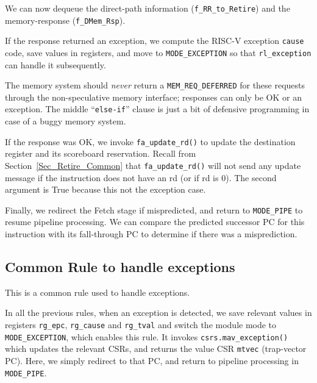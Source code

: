 
We can now dequeue the direct-path information (\verb|f_RR_to_Retire|)
and the memory-response (\verb|f_DMem_Rsp|).

If the response returned an exception, we compute the RISC-V exception
\verb|cause| code, save values in registers, and move to
\verb|MODE_EXCEPTION| so that \verb|rl_exception| can handle it
subsequently.

The memory system should \emph{never} return a \verb|MEM_REQ_DEFERRED|
for these requests through the non-speculative memory interface;
responses can only be OK or an exception.  The middle
``\verb|else-if|'' clause is just a bit of defensive programming in
case of a buggy memory system.

If the response was OK, we invoke \verb|fa_update_rd()| to update the
destination register and its scoreboard reservation.  Recall from
Section~\ref{Sec_Retire_Common} that \verb|fa_update_rd()| will not
send any update message if the instruction does not have an rd (or if
rd is 0).  The second argument is True because this not the exception
case.

Finally, we redirect the Fetch stage if mispredicted, and return to
\verb|MODE_PIPE| to resume pipeline processing.  We can compare the
predicted successor PC for this instruction with its fall-through PC
to determine if there was a misprediction.




\subsection{Common Rule to handle exceptions}

\label{Sec_Fife_Exception}

This is a common rule used to handle exceptions.


In all the previous rules, when an exception is detected, we save
relevant values in registers \verb|rg_epc|, \verb|rg_cause| and
\verb|rg_tval| and switch the module mode to \verb|MODE_EXCEPTION|,
which enables this rule.  It invokes \verb|csrs.mav_exception()| which
updates the relevant CSRs, and returns the value CSR \verb|mtvec|
(trap-vector PC).  Here, we simply redirect to that PC, and return to
pipeline processing in \verb|MODE_PIPE|.

